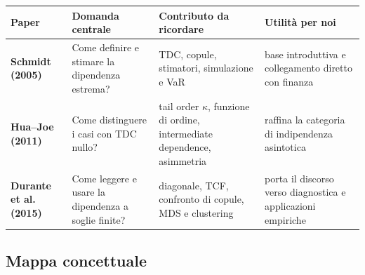 \documentclass[11pt,a4paper]{article}
\begin{document}
\begin{center}
\small
\begin{tabularx}{\textwidth}{>{\bfseries}p{2.4cm}p{3.1cm}X X}
\toprule
Paper & Domanda centrale & Contributo da ricordare & Utilità per noi\\
\midrule
Schmidt (2005) & Come definire e stimare la dipendenza estrema? & TDC, copule, stimatori, simulazione e VaR & base introduttiva e collegamento diretto con finanza\\
Hua--Joe (2011) & Come distinguere i casi con TDC nullo? & tail order $\kappa$, funzione di ordine, intermediate dependence, asimmetria & raffina la categoria di indipendenza asintotica\\
Durante et al. (2015) & Come leggere e usare la dipendenza a soglie finite? & diagonale, TCF, confronto di copule, MDS e clustering & porta il discorso verso diagnostica e applicazioni empiriche\\
\bottomrule
\end{tabularx}
\end{center}

\subsection{Mappa concettuale}

\begin{center}
\end{center}
\end{document}
